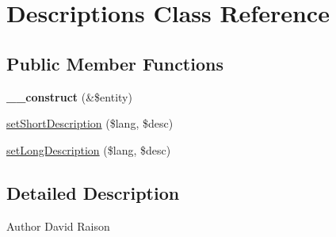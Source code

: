 \hypertarget{classDescriptions}{
\section{Descriptions Class Reference}
\label{classDescriptions}
}
\subsection*{Public Member Functions}
\begin{DoxyCompactItemize}
\item 
\hypertarget{classDescriptions_a3b7684657be08db495e48f577086910b}{
{\bfseries \_\-\_\-construct} (\&\$entity)}
\label{classDescriptions_a3b7684657be08db495e48f577086910b}

\item 
\hyperlink{classDescriptions_a83df570ef7da0e65b1e822d1690f4bfa}{setShortDescription} (\$lang, \$desc)
\item 
\hyperlink{classDescriptions_ae678c3d11f6cf393034ca1c72a75504d}{setLongDescription} (\$lang, \$desc)
\end{DoxyCompactItemize}


\subsection{Detailed Description}
\begin{DoxyAuthor}{Author}
David Raison 
\end{DoxyAuthor}


